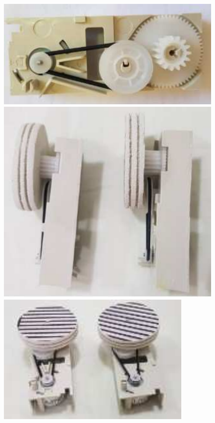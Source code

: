 \documentclass{textolivre}
\begin{document}
\begin{enumerate}
\begin{enumerate}
    \begin{figure}[H]
    \begin{minipage}{0.31\textwidth}
    \includegraphics[width=\linewidth]{figure-05.pdf}
    \subcaption{}
    \end{minipage}
    \hfill
    \begin{minipage}{0.31\textwidth} 
    \includegraphics[width=\linewidth]{figure-06.pdf}
    \subcaption{}
    \end{minipage}
    \hfill
    \begin{minipage}{0.31\textwidth} 
    \includegraphics[width=\linewidth]{figure-07.pdf}

\end{minipage}
\end{figure}
\end{enumerate}
\end{enumerate}
\end{document}
